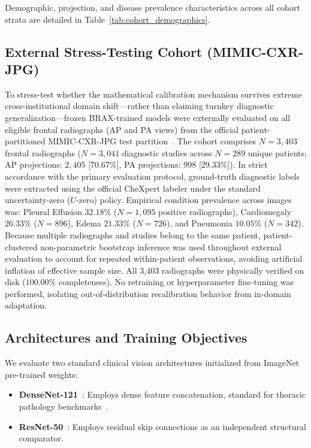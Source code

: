 \documentclass[preprint,12pt]{elsarticle}
\begin{document}
Demographic, projection, and disease prevalence characteristics across all cohort strata are detailed in Table~\ref{tab:cohort_demographics}.

\begin{table}[!t]
\caption{Cohort Demographics, Radiographic Projections, and Target Condition Prevalence across Stratified Cohorts}
\label{tab:cohort_demographics}
\centering
\resizebox{\textwidth}{!}{%

}
\end{table}

\subsection{External Stress-Testing Cohort (MIMIC-CXR-JPG)}
To stress-test whether the mathematical calibration mechanism survives extreme cross-institutional domain shift—rather than claiming turnkey diagnostic generalization—frozen BRAX-trained models were externally evaluated on all eligible frontal radiographs (AP and PA views) from the official patient-partitioned MIMIC-CXR-JPG test partition~\cite{johnson2019mimic,johnson2019mimicjpg}. The cohort comprises $N = 3,403$ frontal radiographs ($N = 3,041$ diagnostic studies across $N = 289$ unique patients; AP projections: $2,405$ [$70.67\%$], PA projections: $998$ [$29.33\%$]). In strict accordance with the primary evaluation protocol, ground-truth diagnostic labels were extracted using the official CheXpert labeler under the standard uncertainty-zero ($U\text{-zero}$) policy. Empirical condition prevalence across images was: Pleural Effusion $32.18\%$ ($N = 1,095$ positive radiographs), Cardiomegaly $26.33\%$ ($N = 896$), Edema $21.33\%$ ($N = 726$), and Pneumonia $10.05\%$ ($N = 342$). Because multiple radiographs and studies belong to the same patient, patient-clustered non-parametric bootstrap inference was used throughout external evaluation to account for repeated within-patient observations, avoiding artificial inflation of effective sample size. All 3,403 radiographs were physically verified on disk ($100.00\%$ completeness). No retraining or hyperparameter fine-tuning was performed, isolating out-of-distribution recalibration behavior from in-domain adaptation.

\subsection{Architectures and Training Objectives}
We evaluate two standard clinical vision architectures initialized from ImageNet pre-trained weights:
\begin{itemize}
    \item \textbf{DenseNet-121}~\cite{densenet2017huang}: Employs dense feature concatenation, standard for thoracic pathology benchmarks~\cite{rajpurkar2017chexnet}.
    \item \textbf{ResNet-50}~\cite{resnet2016he}: Employs residual skip connections as an independent structural comparator.
\end{itemize}
\end{document}
